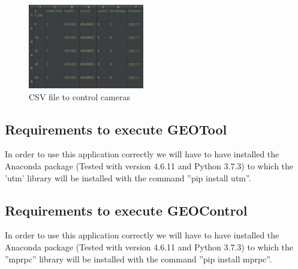 \documentclass[10pt,a4paper,twocolumn,twoside]{article}
\begin{document}
\vspace{0cm}
\begin{figure}[!h]
\centering
  	\includegraphics[width=0.45\textwidth]{fitxercameres}
  	\captionsetup{labelformat=empty}
	\caption{CSV file to control cameras}
	\label{fig-fitxercameres}
\end{figure}

\subsection{Requirements to execute GEOTool}
\label{appendix:requirementsgeotool}

In order to use this application correctly we will have to have installed the Anaconda package (Tested with version 4.6.11 and Python 3.7.3) to which the 'utm' library will be installed with the command ''pip install utm''.

\subsection{Requirements to execute GEOControl}
\label{appendix:requirementsgeocontrol}

In order to use this application correctly we will have to have installed the Anaconda package (Tested with version 4.6.11 and Python 3.7.3) to which the ''mprpc'' library will be installed with the command ''pip install mprpc''.
\end{document}
